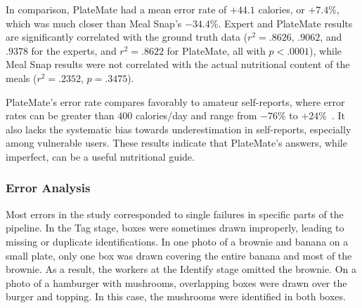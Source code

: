 
In comparison, PlateMate had a mean error rate of $+44.1$ calories, or $+7.4\%$, which was much closer than Meal Snap's $-34.4\%$. Expert and PlateMate results are significantly correlated with the ground truth data ($r^2 = .8626$, $.9062$, and $.9378$ for the experts, and $r^2=.8622$ for PlateMate, all with $p<.0001$), while Meal Snap results were not correlated with the actual nutritional content of the meals ($r^2=.2352$, $p=.3475$).


PlateMate's error rate compares favorably to amateur self-reports, where error rates can be greater than $400$ calories/day and range from $-76\%$ to $+24\%$~\cite{schoeller1990inaccuracies,champagne2002energy}.  It also lacks the systematic bias towards underestimation in self-reports, especially among vulnerable users. These results indicate that PlateMate's answers, while imperfect, can be a useful nutritional guide.

\subsubsection{Error Analysis}

Most errors in the study corresponded to single failures in specific parts of the pipeline.   In the Tag stage, boxes were sometimes drawn improperly, leading to missing or duplicate identifications.  In one photo of a brownie and banana on a small plate, only one box was drawn covering the entire banana and most of the brownie.  As a result, the workers at the Identify stage omitted the brownie.  On a photo of a hamburger with mushrooms, overlapping boxes were drawn over the burger and topping.  In this case, the mushrooms were identified in both boxes.  

